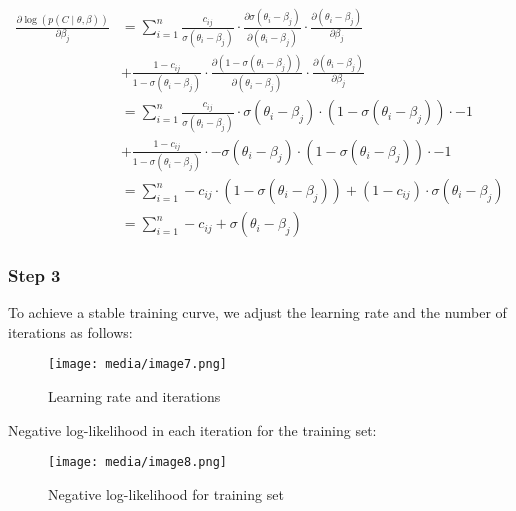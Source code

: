 \documentclass{article}
\begin{document}
\begin{align*}
\frac{\partial\log(p(C \mid \theta,\beta))}{\partial\beta_{j}} &= \sum_{i = 1}^{n}\frac{c_{ij}}{\sigma\left( \theta_{i} - \beta_{j} \right)} \cdot \frac{\partial\sigma\left( \theta_{i} - \beta_{j} \right)}{\partial\left( \theta_{i} - \beta_{j} \right)} \cdot \frac{\partial\left( \theta_{i} - \beta_{j} \right)}{\partial\beta_{j}} \\
&+ \frac{1 - c_{ij}}{1 - \sigma\left( \theta_{i} - \beta_{j} \right)} \cdot \frac{\partial\left( 1 - \sigma\left( \theta_{i} - \beta_{j} \right) \right)}{\partial\left( \theta_{i} - \beta_{j} \right)} \cdot \frac{\partial\left( \theta_{i} - \beta_{j} \right)}{\partial\beta_{j}} \\
&= \sum_{i = 1}^{n}\frac{c_{ij}}{\sigma\left( \theta_{i} - \beta_{j} \right)} \cdot \sigma\left( \theta_{i} - \beta_{j} \right) \cdot \left( 1 - \sigma\left( \theta_{i} - \beta_{j} \right) \right) \cdot - 1 \\
&+ \frac{1 - c_{ij}}{1 - \sigma\left( \theta_{i} - \beta_{j} \right)} \cdot - \sigma\left( \theta_{i} - \beta_{j} \right) \cdot \left( 1 - \sigma\left( \theta_{i} - \beta_{j} \right) \right) \cdot - 1 \\
&= \sum_{i = 1}^{n} - c_{ij} \cdot \left( 1 - \sigma\left( \theta_{i} - \beta_{j} \right) \right) + \left( 1 - c_{ij} \right) \cdot \sigma\left( \theta_{i} - \beta_{j} \right) \\
&= \sum_{i = 1}^{n} - c_{ij} + \sigma\left( \theta_{i} - \beta_{j} \right)
\end{align*}

\subsubsection{Step 3}
To achieve a stable training curve, we adjust the learning rate and the number of iterations as follows:

\begin{figure}[htbp]
\centering
\texttt{[image: media/image7.png]}
\caption{Learning rate and iterations}
\end{figure}

Negative log-likelihood in each iteration for the training set:

\begin{figure}[htbp]
\centering
\texttt{[image: media/image8.png]}
\caption{Negative log-likelihood for training set}
\end{figure}
\end{document}
